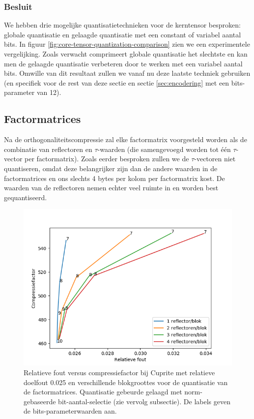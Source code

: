 \subsubsection{Besluit}

We hebben drie mogelijke quantisatietechnieken voor de kerntensor besproken: globale quantisatie en gelaagde quantisatie met een constant of variabel aantal bits. In figuur \ref{fig:core-tensor-quantization-comparison} zien we een experimentele vergelijking. Zoals verwacht comprimeert globale quantisatie het slechtste en kan men de gelaagde quantisatie verbeteren door te werken met een variabel aantal bits. Omwille van dit resultaat zullen we vanaf nu deze laatste techniek gebruiken (en specifiek voor de rest van deze sectie en sectie \ref{sec:encodering} met een bits-parameter van 12).

\subsection{Factormatrices}
\label{sec:quantisatie-factor-matrices}

Na de orthogonaliteitscompressie zal elke factormatrix voorgesteld worden als de combinatie van reflectoren en $\tau$-waarden (die samengevoegd worden tot \'e\'en $\tau$-vector per factormatrix). Zoals eerder besproken zullen we de $\tau$-vectoren niet quantiseren, omdat deze belangrijker zijn dan de andere waarden in de factormatrices en ons slechts 4 bytes per kolom per factormatrix kost. De waarden van de reflectoren nemen echter veel ruimte in en worden best gequantiseerd.

\begin{figure}[H]
  \centering
  \includegraphics[scale=0.7]{images/factor_matrix_quantization_block_cols.png}
  \caption{Relatieve fout versus compressiefactor bij Cuprite met relatieve doelfout 0.025 en verschillende blokgroottes voor de quantisatie van de factormatrices. Quantisatie gebeurde gelaagd met norm-gebaseerde bit-aantal-selectie (zie vervolg subsectie). De labels geven de bits-parameterwaarden aan.}
\label{fig:factor-matrix-quantization-block-cols}
\end{figure}

